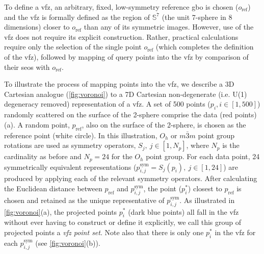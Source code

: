 \documentclass[final,twocolumn,12pt]{elsarticle}
\newcommand{\startpt}{red points}
\newcommand{\refpt}{white circle}
\begin{document}
To define a \gls{vfz}, an arbitrary, fixed, low-symmetry reference \gls{gbo} is chosen ($o_{\text{ref}}$) and the \gls{vfz} is formally defined as the region of $\mathbb{S}^7$ (the unit 7-sphere in 8 dimensions) closer to $o_{\text{ref}}$ than any of its symmetric images. However, use of the \gls{vfz} does not require its explicit construction. Rather, practical calculations require only the selection of the single point $o_{\text{ref}}$ (which completes the definition of the \gls{vfz}), followed by mapping of query points into the \gls{vfz} by comparison of their \glspl{seo} with $o_{\text{ref}}$.

To illustrate the process of mapping points into the \gls{vfz}, we describe a 3D Cartesian analogue (\cref{fig:voronoi}) to a 7D Cartesian non-degenerate (i.e. U(1) degeneracy removed) representation of a \gls{vfz}. A set of \num{500} points ($p_i, i\in[1,500]$) randomly scattered on the surface of the 2-sphere comprise the data (\startpt{}) (a). A random point, $p_{\text{ref}}$, also on the surface of the 2-sphere, is chosen as the reference point (\refpt{}). In this illustration, $O_h$ or $m\bar{3}m$ point group rotations are used as symmetry operators, $S_j,\ j\in[1,N_p]$, where $N_p$ is the cardinality as before and $N_p = 24$ for the $O_h$  point group. For each data point, \num{24} symmetrically equivalent representations ($p^{\text{sym}}_{i,j} = S_j(p_i),\ j\in[1,24]$) are produced by applying each of the relevant symmetry operators. After calculating the Euclidean distance between $p_{\text{ref}}$ and $p^{\text{sym}}_{i,j}$, the point ($p^{*}_i$) closest to $p_{\text{ref}}$ is chosen and retained as the unique representative of $p^{\text{sym}}_{i,j}$. As illustrated in \cref{fig:voronoi}(a), the projected points $p^{*}_i$ (dark blue points) all fall in the \gls{vfz} without ever having to construct or define it explicitly, we call this group of projected points a \textit{\gls{vfz} point set}. Note also that there is only one $p^{*}_i$ in the \gls{vfz} for each $p^{\text{sym}}_{i,j}$ (see \cref{fig:voronoi}(b)).
\end{document}
